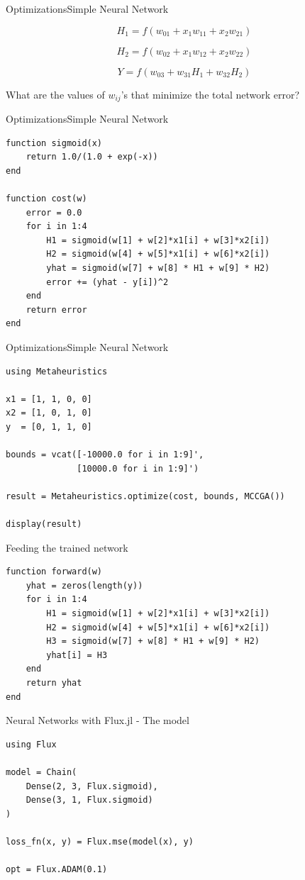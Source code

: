 \documentclass[11pt]{beamer}
\begin{document}
\begin{frame}[fragile]{Optimizations}{Simple Neural Network}

$$
H_1 = f(w_{01} + x_1w_{11} + x_2w_{21})
$$

$$
H_2 = f(w_{02} + x_1w_{12} + x_2w_{22})
$$

$$
Y = f(w_{03} + w_{31}H_1 + w_{32}H_2)
$$

What are the values of $w_{ij}$'s that minimize the total network error?
\end{frame}

\begin{frame}[fragile]{Optimizations}{Simple Neural Network}
\begin{lstlisting}[basicstyle=\tiny]
function sigmoid(x)
	return 1.0/(1.0 + exp(-x))
end 

function cost(w)
	error = 0.0
	for i in 1:4
		H1 = sigmoid(w[1] + w[2]*x1[i] + w[3]*x2[i])
		H2 = sigmoid(w[4] + w[5]*x1[i] + w[6]*x2[i])
		yhat = sigmoid(w[7] + w[8] * H1 + w[9] * H2)
		error += (yhat - y[i])^2
	end 
	return error 
end 
\end{lstlisting}
\end{frame}

\begin{frame}[fragile]{Optimizations}{Simple Neural Network}
\begin{lstlisting}[basicstyle=\small]
using Metaheuristics 

x1 = [1, 1, 0, 0]
x2 = [1, 0, 1, 0]
y  = [0, 1, 1, 0]

bounds = vcat([-10000.0 for i in 1:9]', 
			  [10000.0 for i in 1:9]')

result = Metaheuristics.optimize(cost, bounds, MCCGA())

display(result)
\end{lstlisting}
\end{frame}

\begin{frame}[fragile]{Feeding the trained network}
\begin{lstlisting}[basicstyle=\small]
function forward(w)
	yhat = zeros(length(y))
	for i in 1:4
		H1 = sigmoid(w[1] + w[2]*x1[i] + w[3]*x2[i])
		H2 = sigmoid(w[4] + w[5]*x1[i] + w[6]*x2[i])
		H3 = sigmoid(w[7] + w[8] * H1 + w[9] * H2)
		yhat[i] = H3
	end 
	return yhat
end 
\end{lstlisting}
\end{frame}


\begin{frame}[fragile]{Neural Networks with Flux.jl - The model}
\begin{lstlisting}[basicstyle=\small]
using Flux

model = Chain(
    Dense(2, 3, Flux.sigmoid),
    Dense(3, 1, Flux.sigmoid)
)

loss_fn(x, y) = Flux.mse(model(x), y)

opt = Flux.ADAM(0.1)
\end{lstlisting}
\end{frame}
\end{document}
